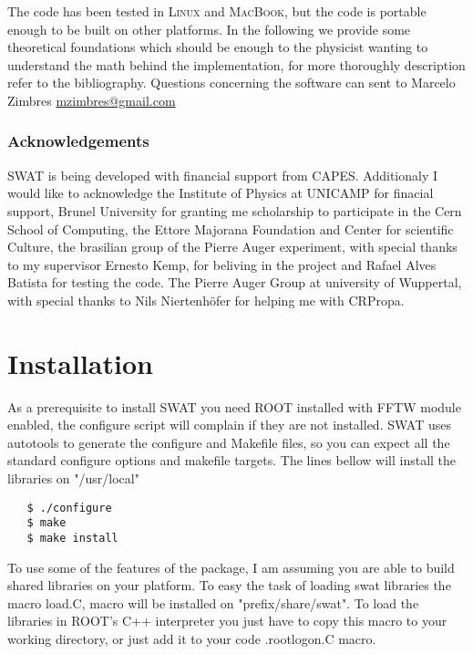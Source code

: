 \documentclass[12pt]{report}
\begin{document}
The code has been tested in \textsc{Linux} and \textsc{MacBook}, but the code
is portable enough to be built on other platforms.  In the following we provide
some theoretical foundations which should be enough to the physicist wanting to
understand the math behind the implementation, for more thoroughly description
refer to the bibliography. Questions concerning the software can sent to
Marcelo Zimbres \href{mailto:mzimbres@gmail.com}{mzimbres@gmail.com}
\vspace{1cm}
\newline
\subsubsection{Acknowledgements}
SWAT is being developed with financial support from CAPES.  Additionaly I would
like to acknowledge the Institute of Physics at UNICAMP for finacial support,
Brunel University for granting me scholarship to participate in the Cern School
of Computing, the Ettore Majorana Foundation and Center for scientific Culture, the brasilian
group of the Pierre Auger experiment, with special thanks to my supervisor
Ernesto Kemp, for beliving in the project and Rafael Alves Batista for testing
the code. The Pierre Auger Group at university of Wuppertal, with special
thanks to Nils Niertenh\"ofer for helping me with CRPropa.

\section{Installation} \label{ch::installation}
As a prerequisite to install SWAT you need ROOT installed with FFTW module
enabled, the configure script will complain if they are not installed. SWAT
uses autotools to generate the configure and Makefile files, so you can
expect all the standard configure options and makefile targets. The lines 
bellow will install the libraries on {\color{brown}"/usr/local"}
{ \color{brown}
   \begin{lstlisting}
   $ ./configure
   $ make
   $ make install
   \end{lstlisting}
}

To use some of the features of the package, I am assuming you are able to
build shared libraries on your platform.  To easy the task of loading
swat libraries the macro load.C, macro will be installed on {\color{brown}"prefix/share/swat"}. To
load the libraries in ROOT's C++ interpreter you just have to copy this macro
to your working directory, or just add it to your code {\color{brown}.rootlogon.C} macro.
\end{document}
